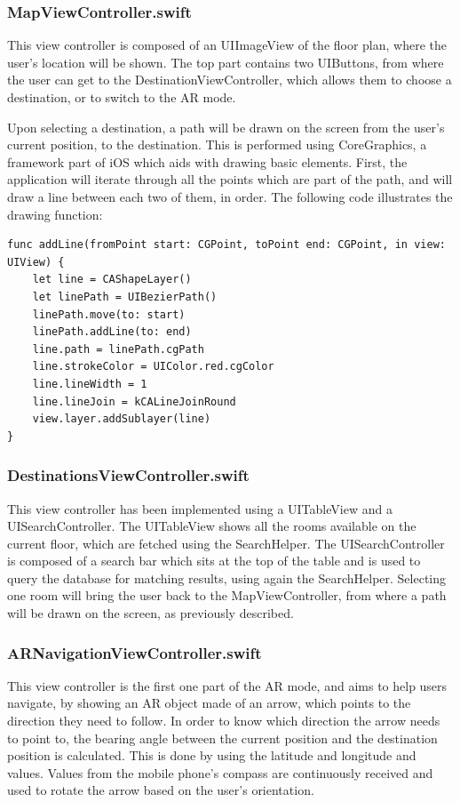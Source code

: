 \subsubsection*{MapViewController.swift}
This view controller is composed of an UIImageView of the floor plan, where the user's location will be shown. The top part contains two UIButtons, from where the user can get to the DestinationViewController, which allows them to choose a destination, or to switch to the AR mode.

Upon selecting a destination, a path will be drawn on the screen from the user's current position, to the destination. This is performed using CoreGraphics, a framework part of iOS which aids with drawing basic elements. First, the application will iterate through all the points which are part of the path, and will draw a line between each two of them, in order. The following code illustrates the drawing function:

\begin{lstlisting}
func addLine(fromPoint start: CGPoint, toPoint end: CGPoint, in view: UIView) {
	let line = CAShapeLayer()
    let linePath = UIBezierPath()
    linePath.move(to: start)
    linePath.addLine(to: end)
    line.path = linePath.cgPath
    line.strokeColor = UIColor.red.cgColor
    line.lineWidth = 1
    line.lineJoin = kCALineJoinRound
    view.layer.addSublayer(line)
}
\end{lstlisting}

\subsubsection*{DestinationsViewController.swift}
This view controller has been implemented using a UITableView and a UISearchController. The UITableView shows all the rooms available on the current floor, which are fetched using the SearchHelper. The UISearchController is composed of a search bar which sits at the top of the table and is used to query the database for matching results, using again the SearchHelper. Selecting one room will bring the user back to the MapViewController, from where a path will be drawn on the screen, as previously described.

\subsubsection*{ARNavigationViewController.swift}
This view controller is the first one part of the AR mode, and aims to help users navigate, by showing an AR object made of an arrow, which points to the direction they need to follow. In order to know which direction the arrow needs to point to, the bearing angle between the current position and the destination position is calculated. This is done by using the latitude and longitude and values. Values from the mobile phone's compass are continuously received and used to rotate the arrow based on the user's orientation.

